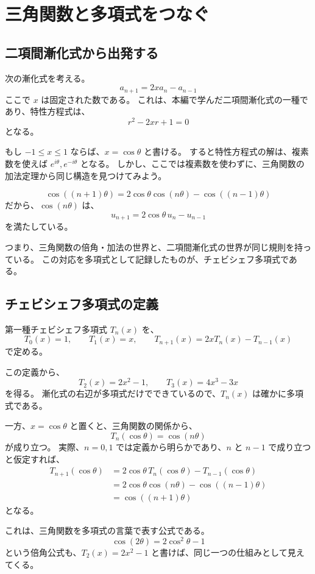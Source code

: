 \section{三角関数と多項式をつなぐ}

\subsection{二項間漸化式から出発する}

次の漸化式を考える。
\[
  a_{n+1}=2x a_n-a_{n-1}
\]
ここで $x$ は固定された数である。
これは、本編で学んだ二項間漸化式の一種であり、特性方程式は、
\[
  r^2-2xr+1=0
\]
となる。

もし $-1\leq x\leq1$ ならば、$x=\cos\theta$ と書ける。
すると特性方程式の解は、複素数を使えば $e^{i\theta},e^{-i\theta}$ となる。
しかし、ここでは複素数を使わずに、三角関数の加法定理から同じ構造を見つけてみよう。

\[
  \cos((n+1)\theta)
  =2\cos\theta\cos(n\theta)-\cos((n-1)\theta)
\]
だから、$\cos(n\theta)$ は、
\[
  u_{n+1}=2\cos\theta\,u_n-u_{n-1}
\]
を満たしている。

つまり、三角関数の倍角・加法の世界と、二項間漸化式の世界が同じ規則を持っている。
この対応を多項式として記録したものが、チェビシェフ多項式である。

\subsection{チェビシェフ多項式の定義}

第一種チェビシェフ多項式 $T_n(x)$ を、
\[
  T_0(x)=1,\qquad T_1(x)=x,\qquad
  T_{n+1}(x)=2xT_n(x)-T_{n-1}(x)
\]
で定める。

この定義から、
\[
  T_2(x)=2x^2-1,\qquad
  T_3(x)=4x^3-3x
\]
を得る。
漸化式の右辺が多項式だけでできているので、$T_n(x)$ は確かに多項式である。

一方、$x=\cos\theta$ と置くと、三角関数の関係から、
\[
  T_n(\cos\theta)=\cos(n\theta)
\]
が成り立つ。
実際、$n=0,1$ では定義から明らかであり、$n$ と $n-1$ で成り立つと仮定すれば、
\[
\begin{aligned}
  T_{n+1}(\cos\theta)
  &=2\cos\theta\,T_n(\cos\theta)-T_{n-1}(\cos\theta)\\
  &=2\cos\theta\cos(n\theta)-\cos((n-1)\theta)\\
  &=\cos((n+1)\theta)
\end{aligned}
\]
となる。

これは、三角関数を多項式の言葉で表す公式である。
\[
  \cos(2\theta)=2\cos^2\theta-1
\]
という倍角公式も、$T_2(x)=2x^2-1$ と書けば、同じ一つの仕組みとして見えてくる。


